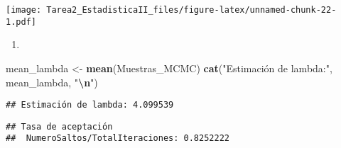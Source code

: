 \documentclass[
]{article}
\newenvironment{Shaded}{\begin{snugshade}}{\end{snugshade}}
\newcommand{\FunctionTok}[1]{\textcolor[rgb]{0.13,0.29,0.53}{\textbf{#1}}}
\newcommand{\NormalTok}[1]{#1}
\newcommand{\OtherTok}[1]{\textcolor[rgb]{0.56,0.35,0.01}{#1}}
\newcommand{\SpecialCharTok}[1]{\textcolor[rgb]{0.81,0.36,0.00}{\textbf{#1}}}
\newcommand{\StringTok}[1]{\textcolor[rgb]{0.31,0.60,0.02}{#1}}
\providecommand{\tightlist}{%
  \setlength{\itemsep}{0pt}\setlength{\parskip}{0pt}}
\begin{document}
\texttt{[image: Tarea2\_EstadisticaII\_files/figure-latex/unnamed-chunk-22-1.pdf]}

\begin{enumerate}
\def\labelenumi{\Alph{enumi})}
\setcounter{enumi}{5}
\tightlist
\item
\end{enumerate}

\begin{Shaded}
\begin{Highlighting}[]
\NormalTok{mean\_lambda }\OtherTok{\textless{}{-}} \FunctionTok{mean}\NormalTok{(Muestras\_MCMC)}
\FunctionTok{cat}\NormalTok{(}\StringTok{"Estimación de lambda:"}\NormalTok{, mean\_lambda, }\StringTok{"}\SpecialCharTok{\textbackslash{}n}\StringTok{"}\NormalTok{)}
\end{Highlighting}
\end{Shaded}

\begin{verbatim}
## Estimación de lambda: 4.099539
\end{verbatim}

\begin{Shaded}
\end{Shaded}

\begin{verbatim}
## Tasa de aceptación 
##  NumeroSaltos/TotalIteraciones: 0.8252222
\end{verbatim}
\end{document}
